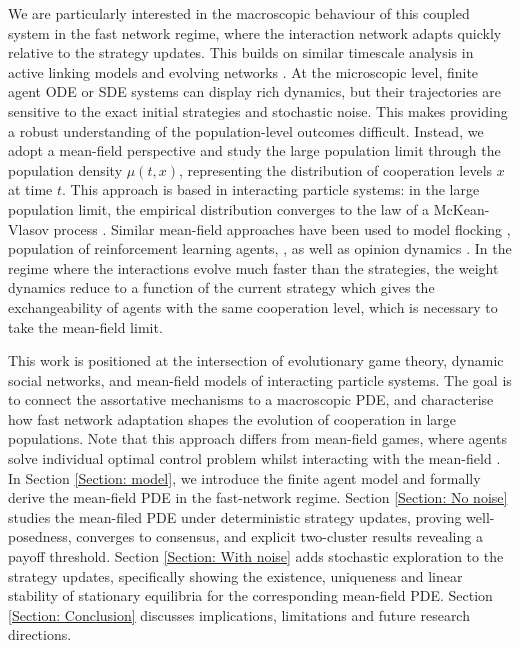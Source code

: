 \documentclass[10pt]{article}
\begin{document}
We are particularly interested in the macroscopic behaviour of this coupled system in the fast network regime, where the interaction network adapts quickly relative to the strategy updates. This builds on similar timescale analysis in active linking models \cite{pacheco_active_2006, segbroeck_coevolution_2010} and evolving networks \cite{bara_enabling_2022, nugent_evolving_2023, guo_network_2023}. At the microscopic level, finite agent ODE or SDE systems can display rich dynamics, but their trajectories are sensitive to the exact initial strategies and stochastic noise. This makes providing a robust understanding of the population-level outcomes difficult. Instead, we adopt a mean-field perspective and study the large population limit through the population density $\mu(t,x)$, representing the distribution of cooperation levels $x$ at time $t$. This approach is based in interacting particle systems: in the large population limit, the empirical distribution converges to the law of a McKean-Vlasov process \cite{propogation_review}. Similar mean-field approaches have been used to model flocking \cite{HASKOVEC201342}, population of reinforcement learning agents, \cite{hu_modelling_2019, leung_modelling_2022, russell2026dynamicspolicygradient}, as well as opinion dynamics \cite{nugent_opinion_2025}. In the regime where the interactions evolve much faster than the strategies, the weight dynamics reduce to a function of the current strategy which gives the exchangeability of agents with the same cooperation level, which is necessary to take the mean-field limit. 

This work is positioned at the intersection of evolutionary game theory, dynamic social networks, and mean-field models of interacting particle systems. The goal is to connect the assortative mechanisms to a macroscopic PDE, and characterise how fast network adaptation shapes the evolution of cooperation in large populations. Note that this approach differs from mean-field games, where agents solve individual optimal control problem whilst interacting with the mean-field \cite{carmona_meanfieldgames}. In Section \ref{Section: model}, we introduce the finite agent model and formally derive the mean-field PDE in the fast-network regime. Section \ref{Section: No noise} studies the mean-filed PDE under deterministic strategy updates, proving well-posedness, converges to consensus, and explicit two-cluster results revealing a payoff threshold. Section \ref{Section: With noise} adds stochastic exploration to the strategy updates, specifically showing the existence, uniqueness and linear stability of stationary equilibria for the corresponding mean-field PDE. Section \ref{Section: Conclusion} discusses implications, limitations and future research directions.
\end{document}
